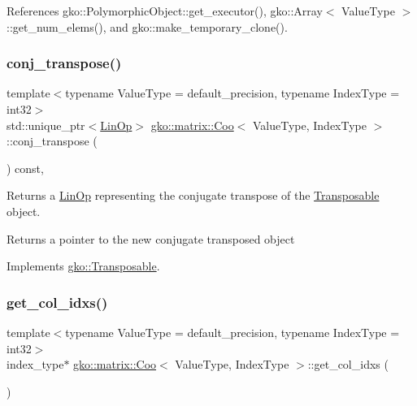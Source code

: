 References gko\+::\+Polymorphic\+Object\+::get\+\_\+executor(), gko\+::\+Array$<$ Value\+Type $>$\+::get\+\_\+num\+\_\+elems(), and gko\+::make\+\_\+temporary\+\_\+clone().

\mbox{\label{classgko_1_1matrix_1_1Coo_ac1d91c524ca616b4c9e5f2a62f3f55ce}} 
\subsubsection{\texorpdfstring{conj\+\_\+transpose()}{conj\_transpose()}}
{\footnotesize\ttfamily template$<$typename Value\+Type = default\+\_\+precision, typename Index\+Type = int32$>$ \\
std\+::unique\+\_\+ptr$<$\hyperlink{classgko_1_1LinOp}{Lin\+Op}$>$ \hyperlink{classgko_1_1matrix_1_1Coo}{gko\+::matrix\+::\+Coo}$<$ Value\+Type, Index\+Type $>$\+::conj\+\_\+transpose (\begin{DoxyParamCaption}{ }\end{DoxyParamCaption}) const\hspace{0.3cm}{\ttfamily [override]}, {\ttfamily [virtual]}}



Returns a \hyperlink{classgko_1_1LinOp}{Lin\+Op} representing the conjugate transpose of the \hyperlink{classgko_1_1Transposable}{Transposable} object. 

\begin{DoxyReturn}{Returns}
a pointer to the new conjugate transposed object 
\end{DoxyReturn}


Implements \hyperlink{classgko_1_1Transposable_ab41b669288740cf2a6f7bf76e875b077}{gko\+::\+Transposable}.

\mbox{\label{classgko_1_1matrix_1_1Coo_a1b619cf23c7c87cb4109432c8e8db66d}} 
\subsubsection{\texorpdfstring{get\+\_\+col\+\_\+idxs()}{get\_col\_idxs()}}
{\footnotesize\ttfamily template$<$typename Value\+Type = default\+\_\+precision, typename Index\+Type = int32$>$ \\
index\+\_\+type$\ast$ \hyperlink{classgko_1_1matrix_1_1Coo}{gko\+::matrix\+::\+Coo}$<$ Value\+Type, Index\+Type $>$\+::get\+\_\+col\+\_\+idxs (\begin{DoxyParamCaption}{ }\end{DoxyParamCaption})\hspace{0.3cm}{\ttfamily [noexcept]}}



